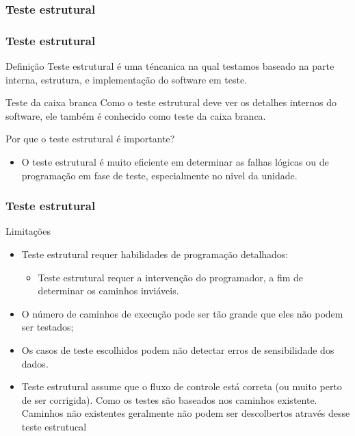 \begin{frame}[parent={cmap:software-testing}, hasprev=false, hasnext=true]
\frametitle{Teste estrutural}
\label{cmap:structural-software-testing}
\label{cmap:structural-testing}

\end{frame}



\begin{frame}[parent={cmap:structural-software-testing},hasnext=true,hasprev=true]
\frametitle{Teste estrutural}
\label{concept:structural-testing}

\begin{block:concept}{Definição}
Teste estrutural é uma téncanica na qual testamos baseado na parte interna, estrutura, e implementação do software em teste.
\end{block:concept}

\begin{block:fact}{Teste da caixa branca}
Como o teste estrutural deve ver os detalhes internos do software, ele também é conhecido como teste da caixa branca.
\end{block:fact}

\begin{block:fact}{Por que o teste estrutural é importante?}
\begin{itemize}
	\item O teste estrutural é muito eficiente em determinar as falhas lógicas ou de programação em fase de teste, especialmente no nivel da unidade.
\end{itemize}
\end{block:fact}
\end{frame}


\begin{frame}
\frametitle{Teste estrutural}

\begin{block:concept}{Limitações}
\begin{itemize}
	\item Teste estrutural requer habilidades de programação detalhados:
	\begin{itemize}
		\item Teste estrutural requer a intervenção do programador, a fim de determinar os caminhos inviáveis.
	\end{itemize}

	\item O número de caminhos de execução pode ser tão grande que eles não podem ser testados;

	\item Os casos de teste escolhidos podem não detectar erros de sensibilidade dos dados.
	

	\item Teste estrutural assume que o fluxo de controle está correta (ou muito perto de ser corrigida). Como os testes são baseados nos caminhos existente. Caminhos não existentes geralmente não podem ser descolbertos através desse teste estrutucal
\end{itemize}
\end{block:concept}
\end{frame}


